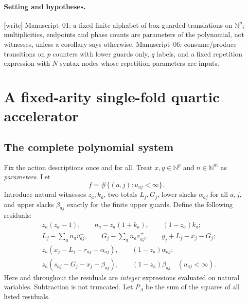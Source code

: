 \documentclass[11pt,a4paper]{article}
\theoremstyle{definition}
\theoremstyle{remark}
\newcommand{\N}{\mathbb N}
\newcommand{\wtag}{\textup{[write]}}%
\newcommand{\srctag}[1]{\texorpdfstring{\hspace{0.5em}{\normalfont\small\color{accent}[#1]}}{ [#1]}}
\begin{document}
\paragraph{Setting and hypotheses.} \wtag{} Manuscript~01: a fixed finite alphabet of box-guarded translations on $\N^p$; multiplicities, endpoints and phase counts are parameters of the polynomial, not witnesses, unless a corollary says otherwise. Manuscript~06: consume/produce transitions on $p$ counters with lower guards only, $q$ labels, and a fixed repetition expression with $N$ syntax nodes whose repetition parameters are inputs.

\section{A fixed-arity single-fold quartic accelerator\srctag{01}}\label{cdc:ct:sec:accelerator}
\subsection{The complete polynomial system}
Fix the action descriptions once and for all. Treat $x,y\in\N^p$ and $n\in\N^m$ as \emph{parameters}. Let
\[
 f=\#\{(a,j):u_{aj}<\infty\}.
\]
Introduce natural witnesses $z_a,k_a$, two totals $L_j,G_j$, lower slacks $\alpha_{aj}$ for all $a,j$, and upper slacks $\beta_{aj}$ exactly for the finite upper guards. Define the following residuals:
\begin{align}
 &z_a(z_a-1),\qquad n_a-z_a(1+k_a),\qquad (1-z_a)k_a;
 \label{cdc:ct:eq:acc-support}\\
 &L_j-\sum_a n_a v_{aj}^-,\qquad
 G_j-\sum_a n_a v_{aj}^+,\qquad
 y_j+L_j-x_j-G_j;\label{cdc:ct:eq:acc-total}\\
 &z_a(x_j-L_j-r_{aj}-\alpha_{aj}),\qquad
 (1-z_a)\alpha_{aj};\label{cdc:ct:eq:acc-lower}\\
 &z_a(s_{aj}-G_j-x_j-\beta_{aj}),\qquad
 (1-z_a)\beta_{aj}\quad(u_{aj}<\infty).
 \label{cdc:ct:eq:acc-upper}
\end{align}
Here and throughout the residuals are \emph{integer} expressions evaluated on natural variables. Subtraction is not truncated. Let $P_A$ be the sum of the squares of all listed residuals.
\end{document}
